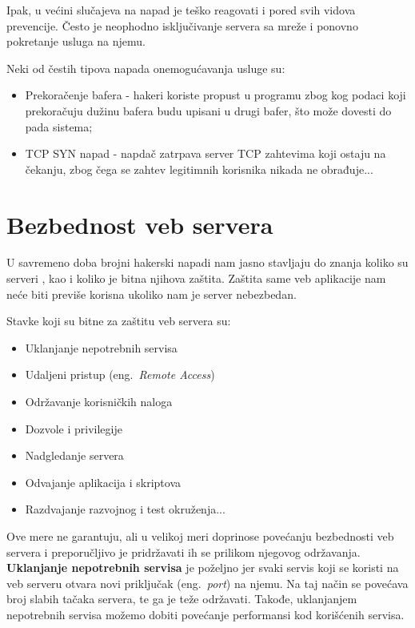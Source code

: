\documentclass[a4paper]{article}
\begin{document}
Ipak, u većini slučajeva  na napad je teško reagovati i pored svih vidova prevencije. Često je neophodno isključivanje servera sa mreže i ponovno pokretanje usluga na njemu.

Neki od čestih tipova napada onemogućavanja usluge su: \cite{DoS}
\begin{itemize}
	\item Prekoračenje bafera - hakeri koriste propust u programu zbog kog podaci koji prekoračuju dužinu bafera budu upisani u drugi bafer, što može dovesti do pada sistema;
	\item TCP SYN napad - napdač zatrpava server TCP zahtevima koji ostaju na čekanju, zbog čega se zahtev legitimnih korisnika nikada ne obrađuje...
\end{itemize}

\section{Bezbednost veb servera} \label{server}

U savremeno doba brojni hakerski napadi nam jasno stavljaju do znanja koliko su serveri , kao i koliko je bitna njihova zaštita. Zaštita same veb aplikacije nam neće biti previše korisna ukoliko nam je server nebezbedan.

Stavke koji su bitne za zaštitu veb servera su:
\begin{itemize}
	\item Uklanjanje nepotrebnih servisa
	\item Udaljeni pristup (eng.~{\em Remote Access})
	\item Održavanje korisničkih naloga
	\item Dozvole i privilegije
	\item Nadgledanje servera
	\item Odvajanje aplikacija i skriptova
	\item Razdvajanje razvojnog i test okruženja...
\end{itemize}

Ove mere ne garantuju, ali u velikoj meri doprinose povećanju bezbednosti veb servera i preporučljivo je pridržavati ih se prilikom njegovog održavanja.\\

\textbf{Uklanjanje nepotrebnih servisa} je poželjno jer svaki servis koji se koristi na veb serveru otvara novi priključak (eng.~{\em port}) na njemu. Na taj način se povećava broj slabih tačaka servera, te ga je teže održavati. Takođe, uklanjanjem nepotrebnih servisa možemo dobiti povećanje performansi kod korišćenih servisa.
\end{document}

